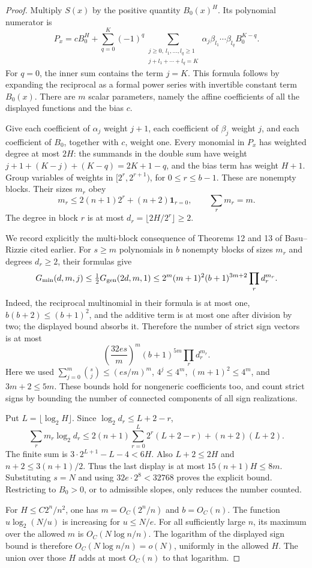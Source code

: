 \documentclass[11pt]{article}
\begin{document}
\begin{proof}
Multiply $S(x)$ by the positive quantity $B_0(x)^H$. Its polynomial
numerator is
\[
 P_x=cB_0^H+
 \sum_{q=0}^K(-1)^q
 \sum_{\substack{j\ge0,\ l_1,\ldots,l_q\ge1\\
                  j+l_1+\cdots+l_q=K}}
 \alpha_j\beta_{l_1}\cdots\beta_{l_q}B_0^{K-q}.
\]
For $q=0$, the inner sum contains the term $j=K$.
This formula follows by expanding the reciprocal as a formal power
series with invertible constant term $B_0(x)$. There are $m$ scalar
parameters, namely the affine coefficients of all the displayed
functions and the bias $c$.

Give each coefficient of $\alpha_j$ weight $j+1$, each coefficient
of $\beta_j$ weight $j$, and each coefficient of $B_0$, together
with $c$, weight one. Every monomial in $P_x$ has weighted degree
at most $2H$: the summands in the double sum have weight
$j+1+(K-j)+(K-q)=2K+1-q$, and the bias term has weight $H+1$.
Group variables of weights in $[2^r,2^{r+1})$, for
$0\le r\le b-1$. These are nonempty blocks. Their sizes $m_r$ obey
\[
 m_r\le 2(n+1)2^r+(n+2)\mathbf1_{r=0},
 \qquad \sum_r m_r=m.
\]
The degree in block $r$ is at most
$d_r=\lfloor2H/2^r\rfloor\ge2$.

We record explicitly the multi-block consequence of Theorems 12 and
13 of Basu--Rizzie cited earlier. For $s\ge m$ polynomials in $b$
nonempty blocks of sizes $m_r$ and degrees $d_r\ge2$, their formulas
give
\[
 G_{\min}(d,m,j)\le\tfrac12G_{\rm gen}(2d,m,1)
 \le 2^m(m+1)^2(b+1)^{3m+2}\prod_r d_r^{m_r}.
\]
Indeed, the reciprocal multinomial in their formula is at most one,
$b(b+2)\le(b+1)^2$, and the additive term is at most one after
division by two; the displayed bound absorbs it. Therefore the
number of strict sign vectors is at most
\[
 \left(\frac{32es}{m}\right)^m(b+1)^{5m}
 \prod_r d_r^{m_r}.
\]
Here we used $\sum_{j=0}^m\binom sj\le(es/m)^m$,
$4^j\le4^m$, $(m+1)^2\le4^m$, and
$3m+2\le5m$. These bounds hold for nongeneric coefficients too,
and count strict signs by bounding the number of connected components
of all sign realizations.

Put $L=\lfloor\log_2H\rfloor$. Since
$\log_2d_r\le L+2-r$,
\[
 \sum_r m_r\log_2d_r
 \le 2(n+1)\sum_{r=0}^L2^r(L+2-r)+(n+2)(L+2).
\]
The finite sum is $3\cdot2^{L+1}-L-4<6H$.
Also $L+2\le2H$ and $n+2\le3(n+1)/2$. Thus the last display is
at most $15(n+1)H\le8m$. Substituting $s=N$ and using
$32e\cdot2^8<32768$ proves the explicit bound. Restricting to
$B_0>0$, or to admissible slopes, only reduces the number counted.

For $H\le C2^n/n^2$, one has $m=O_C(2^n/n)$ and $b=O_C(n)$.
The function $u\log_2(N/u)$ is increasing for $u\le N/e$.
For all sufficiently large $n$, its maximum over the allowed $m$
is $O_C(N\log n/n)$. The logarithm of the displayed sign bound is
therefore $O_C(N\log n/n)=o(N)$, uniformly in the allowed $H$.
The union over those $H$ adds at most $O_C(n)$ to that logarithm.
\end{proof}
\end{document}
